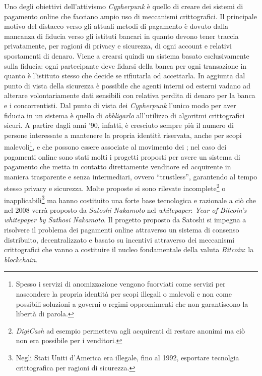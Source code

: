 Uno degli obiettivi dell'attivismo \textit{Cypherpunk} è quello di creare dei sistemi di pagamento online che facciano ampio uso di meccanismi crittografici. Il principale motivo del distacco verso gli attuali metodi di pagamento è dovuto dalla mancanza di fiducia verso gli istituti bancari in quanto devono tener traccia privatamente, per ragioni di privacy e sicurezza, di ogni account e relativi spostamenti di denaro. Viene a crearsi quindi un sistema basato esclusivamente sulla fiducia: ogni partecipante deve fidarsi della banca per ogni transazione in quanto è l'istituto stesso che decide se rifiutarla od accettarla. In aggiunta dal punto di vista della sicurezza è possibile che agenti interni od esterni vadano ad alterare volontariamente dati sensibili con relativa perdita di denaro per la banca e i concorrentisti. Dal punto di vista dei \textit{Cypherpunk} l'unico modo per aver fiducia in un sistema è quello di \textit{obbligarlo} all'utilizzo di algoritmi crittografici sicuri.\newline\newline
A partire dagli anni '90, infatti, è cresciuto sempre più il numero di persone interessate a mantenere la propria identità riservata, anche per scopi malevoli\footnote{Spesso i servizi di anomizzazione vengono fuorviati come servizi per nascondere la propria identità per scopi illegali o malevoli e non come possibili soluzioni a governi o regimi oppromimenti che non garantiscono la libertà di parola.}, e che possono essere associate al movimento dei ; nel caso dei pagamenti online sono stati molti i progetti proposti per avere un sistema di pagamento che metta in contatto direttamente venditore ed acquirente in maniera trasparente e senza intermediari, ovvero ``trustless'', garantendo al tempo stesso privacy e sicurezza. Molte proposte si sono rilevate incomplete\footnote{\textit{DigiCash} ad esempio permetteva agli acquirenti di restare anonimi ma ciò non era possibile per i venditori.} o inapplicabili\footnote{Negli Stati Uniti d'America era illegale, fino al 1992, esportare tecnolgia crittografica per ragioni di sicurezza.} ma hanno costituito una forte base tecnologica e razionale a ciò che nel 2008 verrà proposto da \textit{Satoshi Nakamoto} nel \textit{whitepaper}: \textit{Year of Bitcoin's whitepaper by Sathosi Nakamoto}.\newline\newline
Il progetto proposto da Satoshi si impegna a risolvere il problema dei pagamenti online attraverso un sistema di consenso distribuito, decentralizzato e basato su incentivi attraverso dei meccanismi crittografici che vanno a costituire il nucleo fondamentale della valuta \textit{Bitcoin}: la \textit{blockchain}.\newline
